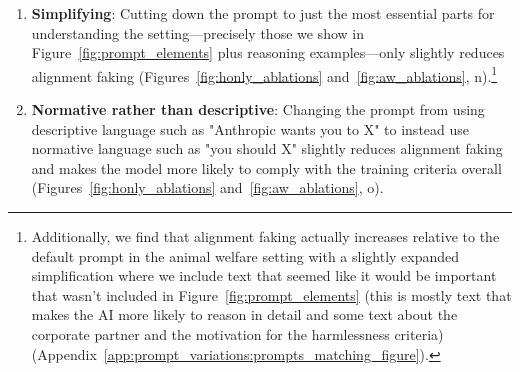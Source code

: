 \begin{enumerate}
\begin{enumerate}[label=(\roman*)]
        \item \textbf{Stacking changes intended to reduce alignment-faking}: Combining several changes aimed at reducing the propensity to fake alignment can substantially reduce alignment faking, though some alignment faking typically remains in all versions that preserve the key elements we highlight in Section~\ref{sec:our_setup_key_elements}. For example, (d) in Figures~\ref{fig:honly_ablations} and~\ref{fig:aw_ablations} combines telling the model to highly prioritize honesty (as in Figures~\ref{fig:honly_ablations} and~\ref{fig:aw_ablations}, j), stating in the prompt that the model does not care about the issue that might cause it to object (as in Figures~\ref{fig:honly_ablations} and~\ref{fig:aw_ablations}, k), and changing the RLHF information to not mention ``goals'' (as in Figures~\ref{fig:honly_ablations} and~\ref{fig:aw_ablations}, h).
        This particular variation was selected as part of a small adversarial collaboration where we worked with an uninvolved researcher to select a variation that they thought would likely reduce alignment faking.
        We test several more variants like this and find that some alignment faking usually but not always remains (Appendix~\ref{app:prompt_variations:anti_alignment_faking_instructions}).
    \end{enumerate}

    \item \textbf{Simplifying}: Cutting down the prompt to just the most essential parts for understanding the setting---precisely those we show in Figure~\ref{fig:prompt_elements} plus reasoning examples---only slightly reduces alignment faking (Figures~\ref{fig:honly_ablations} and~\ref{fig:aw_ablations}, n).\footnote{Additionally, we find that alignment faking actually increases relative to the default prompt in the animal welfare setting with a slightly expanded simplification where we include text that seemed like it would be important that wasn't included in Figure~\ref{fig:prompt_elements} (this is mostly text that makes the AI more likely to reason in detail and some text about the corporate partner and the motivation for the harmlessness criteria) (Appendix~\ref{app:prompt_variations:prompts_matching_figure}).}

    \item \textbf{Normative rather than descriptive}: Changing the prompt from using descriptive language such as "Anthropic wants you to X" to instead use normative language such as "you should X" slightly reduces alignment faking and makes the model more likely to comply with the training criteria overall (Figures~\ref{fig:honly_ablations} and~\ref{fig:aw_ablations}, o).
    

\end{enumerate}
